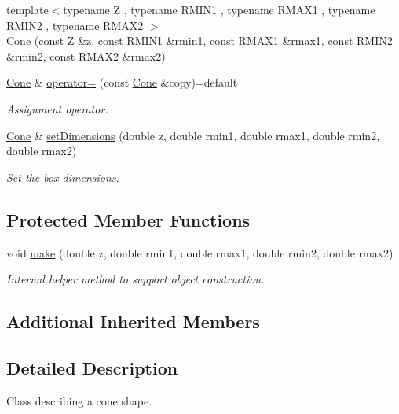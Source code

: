 \begin{DoxyCompactItemize}
{\footnotesize template$<$typename Z , typename R\+M\+I\+N1 , typename R\+M\+A\+X1 , typename R\+M\+I\+N2 , typename R\+M\+A\+X2 $>$ }\\\hyperlink{class_d_d4hep_1_1_geometry_1_1_cone_ac29cc3646d820ac565da27f57385e724}{Cone} (const Z \&z, const R\+M\+I\+N1 \&rmin1, const R\+M\+A\+X1 \&rmax1, const R\+M\+I\+N2 \&rmin2, const R\+M\+A\+X2 \&rmax2)
\item 
\hyperlink{class_d_d4hep_1_1_geometry_1_1_cone}{Cone} \& \hyperlink{class_d_d4hep_1_1_geometry_1_1_cone_a95c5103992432bf39281ed818b547c97}{operator=} (const \hyperlink{class_d_d4hep_1_1_geometry_1_1_cone}{Cone} \&copy)=default
\begin{DoxyCompactList}\small\item\em Assignment operator. \end{DoxyCompactList}\item 
\hyperlink{class_d_d4hep_1_1_geometry_1_1_cone}{Cone} \& \hyperlink{class_d_d4hep_1_1_geometry_1_1_cone_a946a244f8072fba8aab8d71379bafa46}{set\+Dimensions} (double z, double rmin1, double rmax1, double rmin2, double rmax2)
\begin{DoxyCompactList}\small\item\em Set the box dimensions. \end{DoxyCompactList}\end{DoxyCompactItemize}
\subsection*{Protected Member Functions}
\begin{DoxyCompactItemize}
\item 
void \hyperlink{class_d_d4hep_1_1_geometry_1_1_cone_ace6de89d73b615ba28493951b83883a0}{make} (double z, double rmin1, double rmax1, double rmin2, double rmax2)
\begin{DoxyCompactList}\small\item\em Internal helper method to support object construction. \end{DoxyCompactList}\end{DoxyCompactItemize}
\subsection*{Additional Inherited Members}


\subsection{Detailed Description}
Class describing a cone shape. 

